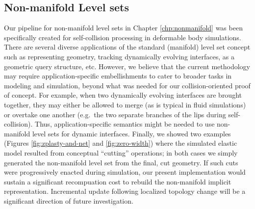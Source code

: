 \subsection{Non-manifold Level sets}

Our pipeline for non-manifold level sets in Chapter
\ref{chp:nonmanifold} was been specifically created for self-collision
processing in deformable body simulations. There are several diverse
applications of the standard (manifold) level set concept such as
representing geometry, tracking dynamically evolving interfaces, as a
geometric query structure, etc. However, we believe that the current
methodology may require application-specific embellishments to cater
to broader tasks in modeling and simulation, beyond what was needed
for our collision-oriented proof of concept.  For example, when two
dynamically evolving interfaces are brought together, they may either
be allowed to merge (as is typical in fluid simulations) or overtake
one another (e.g.\ the two separate branches of the lips during
self-collision). Thus, application-specific semantics might be needed
to use non-manifold level sets for dynamic interfaces.  Finally, we
showed two examples (Figures \ref{fig:zplasty-and-net} and
\ref{fig:zero-width}) where the simulated elastic model resulted from
conceptual ``cutting'' operations; in both cases we simply generated
the non-manifold level set from the final, cut geometry. If such cuts
were progressively enacted during simulation, our present
implementation would sustain a significant recompuation cost to
rebuild the non-manifold implicit representation. Incremental update
following localized topology change will be a significant direction of
future investigation.


